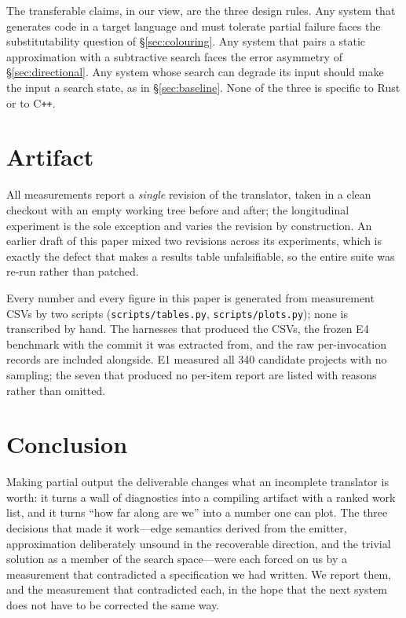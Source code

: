 \documentclass[10pt,twocolumn]{article}
\begin{document}
The transferable claims, in our view, are the three design rules. Any system
that generates code in a target language and must tolerate partial failure
faces the substitutability question of \S\ref{sec:colouring}. Any system that
pairs a static approximation with a subtractive search faces the error
asymmetry of \S\ref{sec:directional}. Any system whose search can degrade its
input should make the input a search state, as in \S\ref{sec:baseline}. None
of the three is specific to Rust or to C\texttt{++}.

\section*{Artifact}

All measurements report a \emph{single} revision of the translator, taken in
a clean checkout with an empty working tree before and after; the longitudinal
experiment is the sole exception and varies the revision by construction. An
earlier draft of this paper mixed two revisions across its experiments, which
is exactly the defect that makes a results table unfalsifiable, so the entire
suite was re-run rather than patched.

Every number and every figure in this paper is generated from measurement CSVs
by two scripts (\texttt{scripts/tables.py}, \texttt{scripts/plots.py}); none is
transcribed by hand. The harnesses that produced the CSVs, the frozen E4
benchmark with the commit it was extracted from, and the raw per-invocation
records are included alongside. E1 measured all 340 candidate projects with no
sampling; the seven that produced no per-item report are listed with reasons
rather than omitted.

\section{Conclusion}

Making partial output the deliverable changes what an incomplete translator is
worth: it turns a wall of diagnostics into a compiling artifact with a ranked
work list, and it turns ``how far along are we'' into a number one can plot.
The three decisions that made it work---edge semantics derived from the
emitter, approximation deliberately unsound in the recoverable direction, and
the trivial solution as a member of the search space---were each forced on us
by a measurement that contradicted a specification we had written. We report
them, and the measurement that contradicted each, in the hope that the next
system does not have to be corrected the same way.
\end{document}
